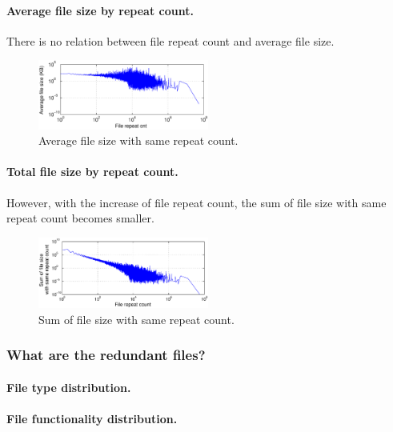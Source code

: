 \paragraph{Average file size by repeat count.}

There is no relation between file repeat count and average file size.

\begin{figure}
	\centering
	\includegraphics[width=0.5\textwidth]{graphs/avg_size_by_cnt.eps}
	\caption{Average file size with same repeat count.
	}
	\label{fig_avg_size_by_cnt}
\end{figure}

\paragraph{Total file size by repeat count.}

However, with the increase of file repeat count, the sum of file size with same repeat count becomes smaller.

\begin{figure}
	\centering
	\includegraphics[width=0.5\textwidth]{graphs/sum_size_by_cnt.eps}
	\caption{Sum of file size with same repeat count.
	}
	\label{fig_sum_by_cnt}
\end{figure}

\subsubsection{What are the redundant files?}


\paragraph{File type distribution.}


\paragraph{File functionality distribution.}


